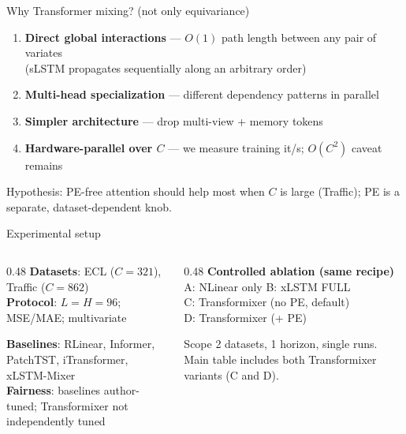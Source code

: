 \documentclass[aspectratio=169,11pt]{beamer}
\begin{document}
\begin{frame}{Why Transformer mixing? (not only equivariance)}
  \begin{enumerate}
    \item \textbf{Direct global interactions} --- $O(1)$ path length between any pair of variates\\
    {\small (sLSTM propagates sequentially along an arbitrary order)}
    \item \textbf{Multi-head specialization} --- different dependency patterns in parallel
    \item \textbf{Simpler architecture} --- drop multi-view + memory tokens
    \item \textbf{Hardware-parallel over $C$} --- we measure training it/s; $O(C^2)$ caveat remains
  \end{enumerate}

  \vspace{0.6em}
  Hypothesis: PE-free attention should help most when $C$ is large (Traffic); PE is a separate, dataset-dependent knob.
\end{frame}

\begin{frame}{Experimental setup}
  \begin{columns}[T]
    \begin{column}{0.48\textwidth}
      \textbf{Datasets}: ECL ($C{=}321$), Traffic ($C{=}862$)\\
      \textbf{Protocol}: $L{=}H{=}96$; MSE/MAE; multivariate
      \vspace{0.4em}

      \textbf{Baselines}: RLinear, Informer, PatchTST, iTransformer, xLSTM-Mixer\\
      \textbf{Fairness}: baselines author-tuned; Transformixer not independently tuned
    \end{column}
    \begin{column}{0.48\textwidth}
      \textbf{Controlled ablation (same recipe)}\\
      A: NLinear only \quad B: xLSTM FULL\\
      C: Transformixer (no PE, default)\\
      D: Transformixer (+ PE)
      \vspace{0.4em}

      \begin{alertblock}{Scope}
        2 datasets, 1 horizon, single runs. Main table includes both Transformixer variants (C and D).
      \end{alertblock}
    \end{column}
  \end{columns}
\end{frame}
\end{document}
